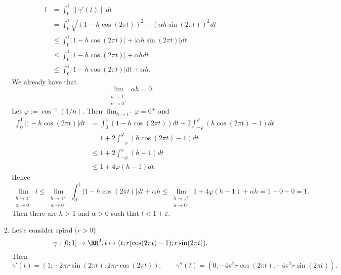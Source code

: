 \documentclass[12pt,a4paper]{article}
\begin{document}
\begin{problem}{72}
\begin{enumerate}
                \begin{align*}
                    l
                    &= \int_0^1 \|\gamma'(t)\| dt\\
                    &= \int_0^1 \sqrt{(1 - h \cos(2\pi t))^2 + (\alpha h \sin(2\pi t))^2} dt\\
                    &\leqslant \int_0^1 |1 - h \cos(2\pi t)| + |\alpha h \sin(2\pi t)| dt\\
                    &\leqslant \int_0^1 |1 - h \cos(2\pi t)| + \alpha h dt\\
                    &\leqslant \int_0^1 |1 - h \cos(2\pi t)| dt + \alpha h.
                \end{align*}
                We already have that
                \[\lim_{\substack{h \to 1^+\\ \alpha \to 0^+}} \alpha h = 0.\]
                Let $\varphi := \cos^{-1}(1/h)$. Then $\lim_{h \to 1^+} \varphi = 0^+$ and
                \begin{align*}
                    \int_0^1 |1 - h \cos(2\pi t)| dt
                    &= \int_0^1 (1 - h \cos(2\pi t)) dt + 2\int_{-\varphi}^\varphi (h \cos(2\pi t) - 1) dt\\
                    &= 1 + 2\int_{-\varphi}^\varphi (h \cos(2\pi t) - 1) dt\\
                    &\leqslant 1 + 2\int_{-\varphi}^\varphi (h - 1) dt\\
                    &\leqslant 1 + 4\varphi (h - 1) dt.
                \end{align*}
                Hence
                \[
                    \lim_{\substack{h \to 1^+\\ \alpha \to 0^+}} l
                    \leqslant \lim_{\substack{h \to 1^+\\ \alpha \to 0^+}} \int_0^1 |1 - h \cos(2\pi t)| dt + \alpha h
                    \leqslant \lim_{\substack{h \to 1^+\\ \alpha \to 0^+}} 1 + 4\varphi (h-1) + \alpha h
                    = 1 + 0 + 0 = 1.
                \]
                Then there are $h > 1$ and $\alpha > 0$ such that $l < 1 + \varepsilon$. 
            \item Let's consider spiral ($r > 0$)
                \[\gamma: [0; 1] \to \RR^3, t \mapsto (t; r (\cos(2\pi t) - 1); r \sin(2\pi t)).\]
                Then
                \[
                    \gamma'(t) = (1; -2\pi r \sin(2\pi t); 2\pi r \cos(2\pi t)),
                    \qquad
                    \gamma''(t) = (0; -4\pi^2 r \cos(2\pi t); -4\pi^2 r \sin(2\pi t)).
\]
\end{enumerate}
\end{problem}
\end{document}

